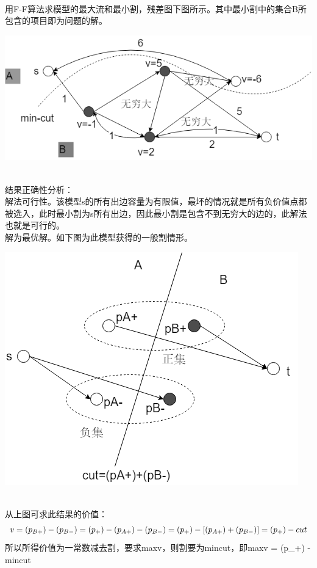 \\用F-F算法求模型的最大流和最小割，残差图下图所示。其中最小割中的集合B所包含的项目即为问题的解。\\
\centerline{\includegraphics[scale=0.6]{image/networkflow10.png}}
\\结果正确性分析：
\\解法可行性。该模型s的所有出边容量为有限值，最坏的情况就是所有负价值点都被选入，此时最小割为s所有出边，因此最小割是包含不到无穷大的边的，此解法也就是可行的。\\
解为最优解。如下图为此模型获得的一般割情形。\\
\centerline{\includegraphics[scale=0.6]{image/networkflow11.png}}
\\从上图可求此结果的价值：\\
\begin{equation}
v = (p_{B+}) - (p_{B-}) = (p_+) - (p_{A+}) - (p_{B-}) = (p_+) - [(p_{A+}) + (p_{B-})] = (p_+) - cut\\
\end{equation}
所以所得价值为一常数减去割，要求maxv，则割要为mincut，即maxv = (p_+) -mincut

